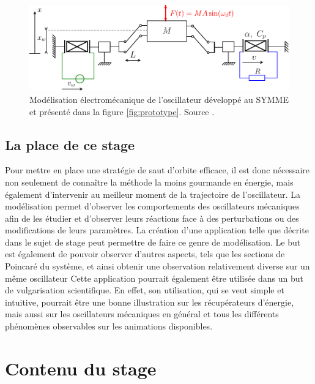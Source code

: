 \documentclass[a4paper, french, 12pt, titlepage]{article}
\begin{document}
\begin{figure}
  \begin{center}
    \includegraphics[width = 1\textwidth]{images/bistable}
  \end{center}
  \caption{Modélisation électromécanique de l'oscillateur développé au SYMME et présenté dans la figure \ref{fig:prototype}.
    Source \cite{csaintmartin2023preprint}.}
  \label{fig:model}
\end{figure}

\subsection{La place de ce stage}

Pour mettre en place une stratégie de saut d'orbite efficace, il est donc nécessaire non seulement de connaître la méthode la moins gourmande en énergie, mais également d'intervenir au meilleur moment de la trajectoire de l'oscillateur.
La modélisation permet d'observer les comportements des oscillateurs mécaniques afin de les étudier et d'observer leurs réactions face à des perturbations ou des modifications de leurs paramètres.
La création d'une application telle que décrite dans le sujet de stage peut permettre de faire ce genre de modélisation.
Le but est également de pouvoir observer d'autres aspects, tels que les sections de Poincaré du système, et ainsi obtenir une observation relativement diverse sur un même oscillateur
Cette application pourrait également être utilisée dans un but de vulgarisation scientifique.
En effet, son utilisation, qui se veut simple et intuitive, pourrait être une bonne illustration sur les récupérateurs d'énergie, mais aussi sur les oscillateurs mécaniques en général et tous les différents phénomènes observables sur les animations disponibles.



\newpage

\section{Contenu du stage}
\end{document}
